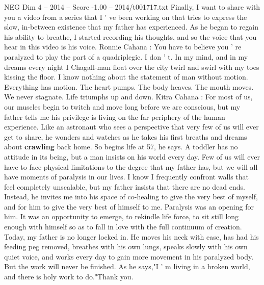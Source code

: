 \begin{textsample}{NEG Dim 4 – 2014 – Score -1.00 – 2014/t001717.txt}
Finally, I want to share with you a video from a series that I ' ve been working on that tries to express the slow, in-between existence that my father has experienced.
As he began to regain his ability to breathe, I started recording his thoughts, and so the voice that you hear in this video is his voice.
Ronnie Cahana : You have to believe you ' re paralyzed to play the part of a quadriplegic.
I don ' t.
In my mind, and in my dreams every night I Chagall-man float over the city twirl and swirl with my toes kissing the floor.
I know nothing about the statement of man without motion.
Everything has motion.
The heart pumps.
The body heaves.
The mouth moves.
We never stagnate.
Life triumphs up and down.
Kitra Cahana : For most of us, our muscles begin to twitch and move long before we are conscious, but my father tells me his privilege is living on the far periphery of the human experience.
Like an astronaut who sees a perspective that very few of us will ever get to share, he wonders and watches as he takes his first breaths and dreams about \textbf{crawling} back home.
So begins life at 57, he says.
A toddler has no attitude in its being, but a man insists on his world every day.
Few of us will ever have to face physical limitations to the degree that my father has, but we will all have moments of paralysis in our lives.
I know I frequently confront walls that feel completely unscalable, but my father insists that there are no dead ends.
Instead, he invites me into his space of co-healing to give the very best of myself, and for him to give the very best of himself to me.
Paralysis was an opening for him.
It was an opportunity to emerge, to rekindle life force, to sit still long enough with himself so as to fall in love with the full continuum of creation.
Today, my father is no longer locked in.
He moves his neck with ease, has had his feeding peg removed, breathes with his own lungs, speaks slowly with his own quiet voice, and works every day to gain more movement in his paralyzed body.
But the work will never be finished.
As he says,"I ' m living in a broken world, and there is holy work to do."Thank you.

\end{textsample}
